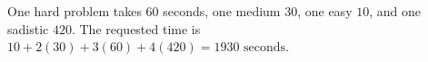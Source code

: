 One hard problem takes $60$ seconds, one medium $30$, one easy $10$, and one sadistic $420$. The requested time is $10+2(30)+3(60)+4(420)=\boxed{1930\text{ seconds}}$.
